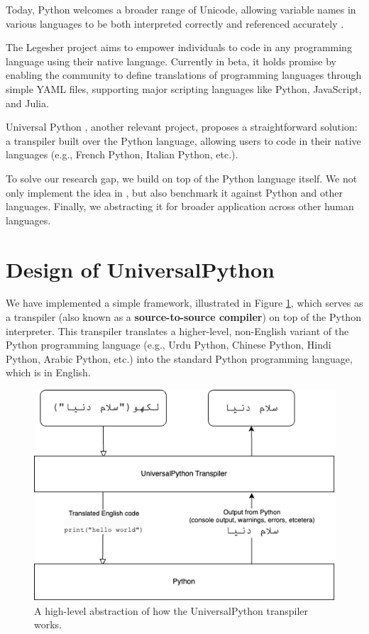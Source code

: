 \documentclass[conference]{IEEEtran}
\begin{document}
Today, Python welcomes a broader range of Unicode, allowing variable names in various languages to be both interpreted correctly and referenced accurately \cite{coghlan2014transition}.

The Legesher \cite{legesher} project aims to empower individuals to code in any programming language using their native language. Currently in beta, it holds promise by enabling the community to define translations of programming languages through simple YAML files, supporting major scripting languages like Python, JavaScript, and Julia.

Universal Python \cite{otten2023towards}, another relevant project, proposes a straightforward solution: a transpiler built over the Python language, allowing users to code in their native languages (e.g., French Python, Italian Python, etc.). 

To solve our research gap, we build on top of the Python language itself. We not only implement the idea in \cite{otten2023towards}, but also benchmark it against Python and other languages. Finally, we abstracting it for broader application across other human languages.

\section{Design of UniversalPython}

We have implemented a simple framework, illustrated in Figure \ref{fig:flowchart}, which serves as a transpiler (also known as a \textbf{source-to-source compiler}) on top of the Python interpreter. This transpiler translates a higher-level, non-English variant of the Python programming language (e.g., Urdu Python, Chinese Python, Hindi Python, Arabic Python, etc.) into the standard Python programming language, which is in English.

\begin{figure}[htbp]
\centerline{\includegraphics[width=\columnwidth]{UniversalPython-flowchart.png}}
\caption{A high-level abstraction of how the UniversalPython transpiler works.}
\label{fig:flowchart}
\end{figure}
\end{document}
